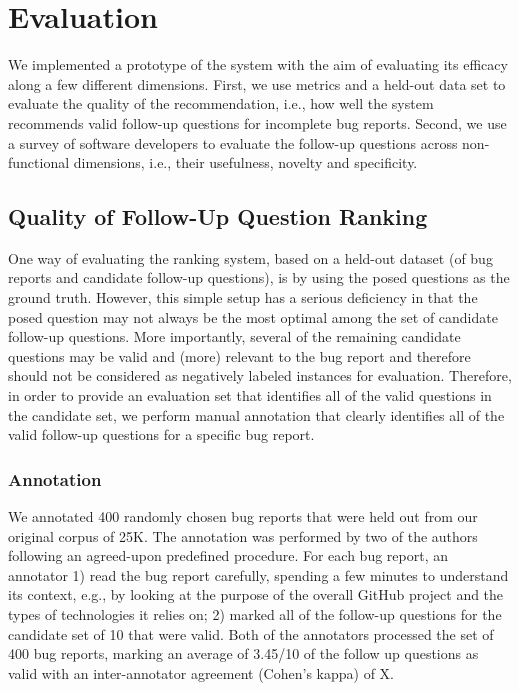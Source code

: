 \section{Evaluation}

We implemented a prototype of the system with the aim of evaluating its efficacy along
a few different dimensions. First, we use metrics and a held-out data set to evaluate the quality
of the recommendation, i.e., how well the system recommends valid follow-up questions for incomplete bug reports.
Second, we use a survey of software developers to evaluate the follow-up questions across non-functional
dimensions, i.e., their usefulness, novelty and specificity.


\subsection{Quality of Follow-Up Question Ranking}

One way of evaluating the ranking system, based on a held-out dataset (of bug reports and candidate follow-up questions), is
by using the posed questions as the ground truth. However, this simple setup has a serious deficiency in that the posed question
may not always be the most optimal among the set of candidate follow-up questions. More importantly, several of
the remaining candidate questions may be valid and (more) relevant to the bug report and therefore should
not be considered as negatively labeled instances for evaluation. Therefore, in order to provide an evaluation
set that identifies all of the valid questions in the candidate set, we perform manual annotation that clearly
identifies all of the valid follow-up questions for a specific bug report.

\subsubsection{Annotation}
We annotated 400 randomly chosen bug reports that were held out from our original corpus of 25K. The annotation
was performed by two of the authors following an agreed-upon predefined procedure. For each bug report, an annotator 1)
read the bug report carefully, spending a few minutes to understand its context, e.g., by looking at the purpose of the overall GitHub
project and the types of technologies it relies on; 2) marked all of the follow-up questions for the candidate set of 10
that were valid. Both of the annotators processed the set of 400 bug reports, marking an average of 3.45/10 of the follow up questions
as valid with an inter-annotator agreement (Cohen's kappa) of X.

